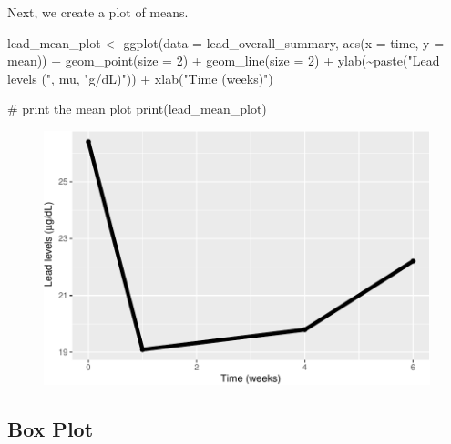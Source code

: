\documentclass[
  letterpaper,
  DIV=11,
  numbers=noendperiod]{scrreprt}
\newenvironment{Shaded}{\begin{snugshade}}{\end{snugshade}}
\newcommand{\AttributeTok}[1]{\textcolor[rgb]{0.40,0.45,0.13}{#1}}
\newcommand{\CommentTok}[1]{\textcolor[rgb]{0.37,0.37,0.37}{#1}}
\newcommand{\DecValTok}[1]{\textcolor[rgb]{0.68,0.00,0.00}{#1}}
\newcommand{\FunctionTok}[1]{\textcolor[rgb]{0.28,0.35,0.67}{#1}}
\newcommand{\NormalTok}[1]{\textcolor[rgb]{0.00,0.23,0.31}{#1}}
\newcommand{\OtherTok}[1]{\textcolor[rgb]{0.00,0.23,0.31}{#1}}
\newcommand{\SpecialCharTok}[1]{\textcolor[rgb]{0.37,0.37,0.37}{#1}}
\newcommand{\StringTok}[1]{\textcolor[rgb]{0.13,0.47,0.30}{#1}}
\begin{document}
Next, we create a plot of means.

\begin{Shaded}
\begin{Highlighting}[]
\NormalTok{lead\_mean\_plot }\OtherTok{\textless{}{-}} \FunctionTok{ggplot}\NormalTok{(}\AttributeTok{data =}\NormalTok{ lead\_overall\_summary, }\FunctionTok{aes}\NormalTok{(}\AttributeTok{x =}\NormalTok{ time, }\AttributeTok{y =}\NormalTok{ mean)) }\SpecialCharTok{+}
    \FunctionTok{geom\_point}\NormalTok{(}\AttributeTok{size =} \DecValTok{2}\NormalTok{) }\SpecialCharTok{+} \FunctionTok{geom\_line}\NormalTok{(}\AttributeTok{size =} \DecValTok{2}\NormalTok{) }\SpecialCharTok{+} \FunctionTok{ylab}\NormalTok{(}\SpecialCharTok{\textasciitilde{}}\FunctionTok{paste}\NormalTok{(}\StringTok{"Lead levels ("}\NormalTok{, mu,}
    \StringTok{"g/dL)"}\NormalTok{)) }\SpecialCharTok{+} \FunctionTok{xlab}\NormalTok{(}\StringTok{"Time (weeks)"}\NormalTok{)}

\CommentTok{\# print the mean plot}
\FunctionTok{print}\NormalTok{(lead\_mean\_plot)}
\end{Highlighting}
\end{Shaded}

\begin{figure}[H]

{\centering \includegraphics{Longi_EDA_files/figure-pdf/unnamed-chunk-9-1.pdf}

}

\end{figure}

\hypertarget{box-plot}{%
\subsection{Box Plot}\label{box-plot}}
\end{document}
